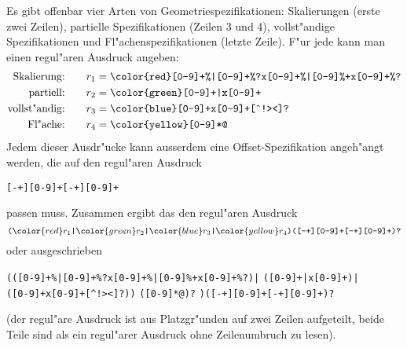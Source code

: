 \begin{loesung}
Es gibt offenbar vier Arten von Geometriespezifikationen: Skalierungen 
(erste zwei Zeilen),
partielle Spezifikationen (Zeilen 3 und 4), vollst"andige Spezifikationen
und Fl"achenspezifikationen (letzte Zeile).
F"ur jede kann man einen regul"aren Ausdruck angeben:
\begin{align*}
\text{Skalierung:}\qquad&r_1 = \texttt{\color{red}[0-9]+\%|[0-9]+\%?x[0-9]+\%|[0-9]\%+x[0-9]+\%?}
\\
\text{partiell:}\qquad&r_2 = \texttt{\color{green}[0-9]+|x[0-9]+}
\\
\text{vollst"andig:}\qquad&r_3 = \texttt{\color{blue}[0-9]+x[0-9]+[\^{}!><]?}
\\
\text{Fl"ache:}\qquad&r_4 = \texttt{\color{yellow}[0-9]*@}
\end{align*}
Jedem dieser Ausdr"ucke kann ausserdem eine Offset-Spezifikation angeh"angt
werden, die auf den regul"aren Ausdruck
\begin{center}
\texttt{[-+][0-9]+[-+][0-9]+}
\end{center}
passen muss. Zusammen ergibt das den regul"aren Ausdruck
\[
\texttt{(}
{\color{red} r_1}
\texttt{|}
{\color{green} r_2}
\texttt{|}
{\color{blue} r_3}
\texttt{|}
{\color{yellow} r_4}
\texttt{)([-+][0-9]+[-+][0-9]+)?}
\]
oder ausgeschrieben
\begin{center}
\texttt{(({\color{red}[0-9]+\%|[0-9]+\%?x[0-9]+\%|[0-9]\%+x[0-9]+\%?})|}%
\texttt{({\color{green}[0-9]+|x[0-9]+})|}\\
\texttt{({\color{blue}[0-9]+x[0-9]+[\^{}!><]?}))}%
\texttt{({\color{yellow}[0-9]*@})?}%
\texttt{)([-+][0-9]+[-+][0-9]+)?}
\end{center}
(der regul"are Ausdruck ist aus Platzgr"unden auf zwei Zeilen aufgeteilt,
beide Teile sind als ein regul"arer Ausdruck ohne Zeilenumbruch zu lesen).
\end{loesung}

